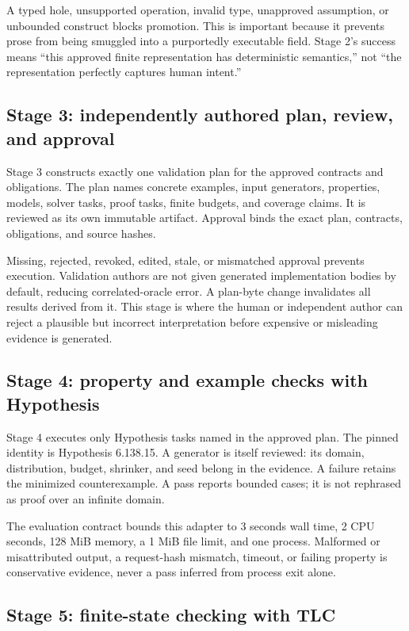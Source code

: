 \documentclass[11pt]{article}
\begin{document}
A typed hole, unsupported operation, invalid type, unapproved assumption, or
unbounded construct blocks promotion.  This is important because it prevents
prose from being smuggled into a purportedly executable field.  Stage 2's
success means ``this approved finite representation has deterministic
semantics,'' not ``the representation perfectly captures human intent.''

\subsection{Stage 3: independently authored plan, review, and approval}

Stage 3 constructs exactly one validation plan for the approved contracts and
obligations.  The plan names concrete examples, input generators, properties,
models, solver tasks, proof tasks, finite budgets, and coverage claims.  It is
reviewed as its own immutable artifact.  Approval binds the exact plan,
contracts, obligations, and source hashes.

Missing, rejected, revoked, edited, stale, or mismatched approval prevents
execution.  Validation authors are not given generated implementation bodies
by default, reducing correlated-oracle error.  A plan-byte change invalidates
all results derived from it.  This stage is where the human or independent
author can reject a plausible but incorrect interpretation before expensive
or misleading evidence is generated.

\subsection{Stage 4: property and example checks with Hypothesis}

Stage 4 executes only Hypothesis tasks named in the approved plan.  The pinned
identity is Hypothesis 6.138.15.  A generator is itself reviewed: its domain,
distribution, budget, shrinker, and seed belong in the evidence.  A failure
retains the minimized counterexample.  A pass reports bounded cases; it is not
rephrased as proof over an infinite domain.

The evaluation contract bounds this adapter to 3 seconds wall time, 2 CPU
seconds, 128 MiB memory, a 1 MiB file limit, and one process.  Malformed or
misattributed output, a request-hash mismatch, timeout, or failing property is
conservative evidence, never a pass inferred from process exit alone.

\subsection{Stage 5: finite-state checking with TLC}
\end{document}
